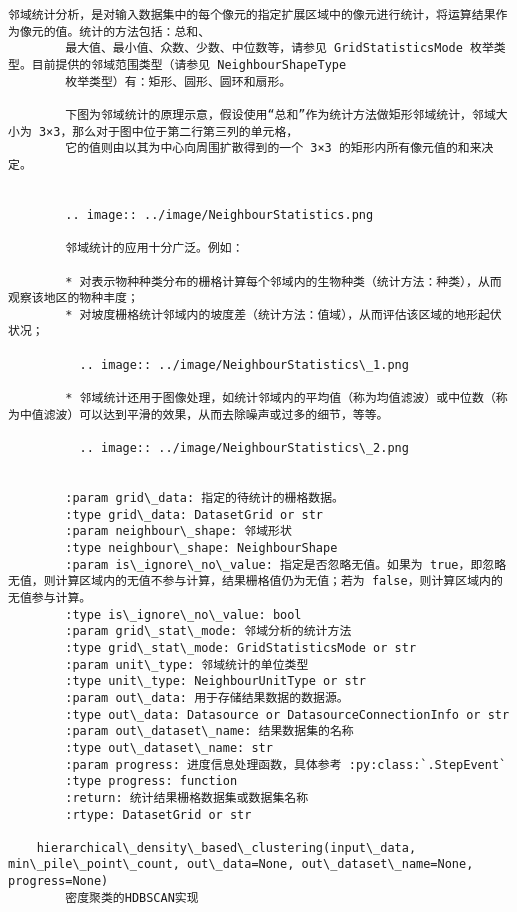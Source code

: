 \documentclass[11pt]{article}
\begin{document}
\begin{Verbatim}[commandchars=\\\{\}]
        邻域统计分析，是对输入数据集中的每个像元的指定扩展区域中的像元进行统计，将运算结果作为像元的值。统计的方法包括：总和、
        最大值、最小值、众数、少数、中位数等，请参见 GridStatisticsMode 枚举类型。目前提供的邻域范围类型（请参见 NeighbourShapeType
        枚举类型）有：矩形、圆形、圆环和扇形。
        
        下图为邻域统计的原理示意，假设使用“总和”作为统计方法做矩形邻域统计，邻域大小为 3×3，那么对于图中位于第二行第三列的单元格，
        它的值则由以其为中心向周围扩散得到的一个 3×3 的矩形内所有像元值的和来决定。
        
        
        .. image:: ../image/NeighbourStatistics.png
        
        邻域统计的应用十分广泛。例如：
        
        * 对表示物种种类分布的栅格计算每个邻域内的生物种类（统计方法：种类），从而观察该地区的物种丰度；
        * 对坡度栅格统计邻域内的坡度差（统计方法：值域），从而评估该区域的地形起伏状况；
        
          .. image:: ../image/NeighbourStatistics\_1.png
        
        * 邻域统计还用于图像处理，如统计邻域内的平均值（称为均值滤波）或中位数（称为中值滤波）可以达到平滑的效果，从而去除噪声或过多的细节，等等。
        
          .. image:: ../image/NeighbourStatistics\_2.png
        
        
        :param grid\_data: 指定的待统计的栅格数据。
        :type grid\_data: DatasetGrid or str
        :param neighbour\_shape: 邻域形状
        :type neighbour\_shape: NeighbourShape
        :param is\_ignore\_no\_value: 指定是否忽略无值。如果为 true，即忽略无值，则计算区域内的无值不参与计算，结果栅格值仍为无值；若为 false，则计算区域内的无值参与计算。
        :type is\_ignore\_no\_value: bool
        :param grid\_stat\_mode: 邻域分析的统计方法
        :type grid\_stat\_mode: GridStatisticsMode or str
        :param unit\_type: 邻域统计的单位类型
        :type unit\_type: NeighbourUnitType or str
        :param out\_data: 用于存储结果数据的数据源。
        :type out\_data: Datasource or DatasourceConnectionInfo or str
        :param out\_dataset\_name: 结果数据集的名称
        :type out\_dataset\_name: str
        :param progress: 进度信息处理函数，具体参考 :py:class:`.StepEvent`
        :type progress: function
        :return: 统计结果栅格数据集或数据集名称
        :rtype: DatasetGrid or str
    
    hierarchical\_density\_based\_clustering(input\_data, min\_pile\_point\_count, out\_data=None, out\_dataset\_name=None, progress=None)
        密度聚类的HDBSCAN实现
        

\end{Verbatim}
\end{document}
